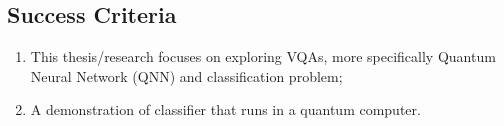 \subsection{Success Criteria}
\begin{enumerate}
    \item This thesis/research focuses on exploring VQAs, more specifically Quantum Neural Network (QNN) and classification problem;
    \item A demonstration of classifier that runs in a quantum computer.
\end{enumerate}

